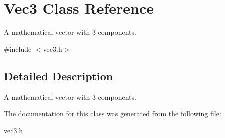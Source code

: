 \hypertarget{class_vec3}{}\section{Vec3 Class Reference}
\label{class_vec3}


A mathematical vector with 3 components.  




{\ttfamily \#include $<$vec3.\+h$>$}



\subsection{Detailed Description}
A mathematical vector with 3 components. 

The documentation for this class was generated from the following file\+:\begin{DoxyCompactItemize}
\item 
\hyperlink{vec3_8h}{vec3.\+h}\end{DoxyCompactItemize}
